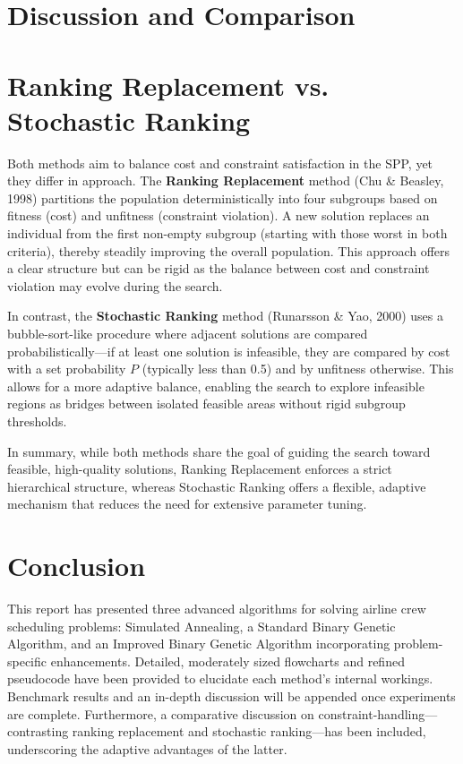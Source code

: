 \documentclass[12pt]{article}
\begin{document}
\newpage

\section{Discussion and Comparison}
\label{sec:discussion}

\newpage

\section{Ranking Replacement vs. Stochastic Ranking}
\label{sec:ranking}
Both methods aim to balance cost and constraint satisfaction in the SPP, yet they differ in approach. The \textbf{Ranking Replacement} method (Chu \& Beasley, 1998) partitions the population deterministically into four subgroups based on fitness (cost) and unfitness (constraint violation). A new solution replaces an individual from the first non-empty subgroup (starting with those worst in both criteria), thereby steadily improving the overall population. This approach offers a clear structure but can be rigid as the balance between cost and constraint violation may evolve during the search.

In contrast, the \textbf{Stochastic Ranking} method (Runarsson \& Yao, 2000) uses a bubble-sort-like procedure where adjacent solutions are compared probabilistically—if at least one solution is infeasible, they are compared by cost with a set probability \(P\) (typically less than 0.5) and by unfitness otherwise. This allows for a more adaptive balance, enabling the search to explore infeasible regions as bridges between isolated feasible areas without rigid subgroup thresholds.

In summary, while both methods share the goal of guiding the search toward feasible, high-quality solutions, Ranking Replacement enforces a strict hierarchical structure, whereas Stochastic Ranking offers a flexible, adaptive mechanism that reduces the need for extensive parameter tuning.
\section{Conclusion}
This report has presented three advanced algorithms for solving airline crew scheduling problems: Simulated Annealing, a Standard Binary Genetic Algorithm, and an Improved Binary Genetic Algorithm incorporating problem-specific enhancements. Detailed, moderately sized flowcharts and refined pseudocode have been provided to elucidate each method's internal workings. Benchmark results and an in-depth discussion will be appended once experiments are complete. Furthermore, a comparative discussion on constraint-handling—contrasting ranking replacement and stochastic ranking—has been included, underscoring the adaptive advantages of the latter.
\end{document}
